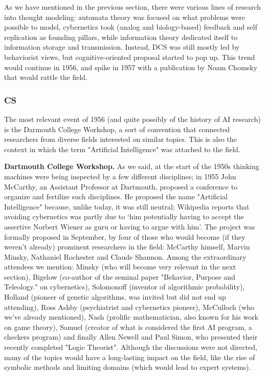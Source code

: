 \documentclass[../main.tex]{subfiles}
\begin{document}
As we have mentioned in the previous section, there were various lines of research into thought modeling: automata theory was focused on what problems were possible to model, cybernetics took (analog and biology-based) feedback and self replication as founding pillars, while information theory dedicated itself to information storage and transmission. Instead, DCS was still mostly led by behaviorist views, but cognitive-oriented proposal started to pop up. This trend would continue in 1956, and spike in 1957 with a publication by Noam Chomsky that would rattle the field.

\subsubsection{CS}
The most relevant event of 1956 (and quite possibly of the history of AI research) is the Darmouth College Workshop, a sort of convention that connected researchers from diverse fields interested on similar topics. This is also the context in which the term "Artificial Intelligence" was attached to the field.

\vspace{4pt}
\textbf{Dartmouth College Workshop.} As we said, at the start of the 1950s thinking machines were being inspected by a few different disciplines; in 1955 John McCarthy, an Assistant Professor at Dartmouth, proposed a conference to organize and fertilize such disciplines. He proposed the name "Artificial Intelligence" because, unlike today, it was still neutral; Wikipedia reports that avoiding cybernetics was partly due to \enquote*{him potentially having to accept the assertive Norbert Wiener as guru or having to argue with him}. The project was formally proposed in September, by four of those who would become (if they weren't already) prominent researchers in the field: McCarthy himself, Marvin Minsky, Nathaniel Rochester and Claude Shannon. Among the extraordinary attendees we mention: Minsky (who will become very relevant in the next section), Bigelow (co-author of the seminal paper "Behavior, Purpose and Teleology." on cybernetics), Solomonoff (inventor of algorithmic probability), Holland (pioneer of genetic algorithms, was invited but did not end up attending), Ross Ashby (psychiatrist and cybernetics pioneer), McCulloch (who we've already mentioned), Nash (prolific mathematician, also known for his work on game theory), Samuel (creator of what is considered the first AI program, a checkers program) and finally Allen Newell and Paul Simon, who presented their recently completed "Logic Theorist". Although the discussions were not directed, many of the topics would have a long-lasting impact on the field, like the rise of symbolic methods and limiting domains (which would lead to expert systems).
\end{document}
